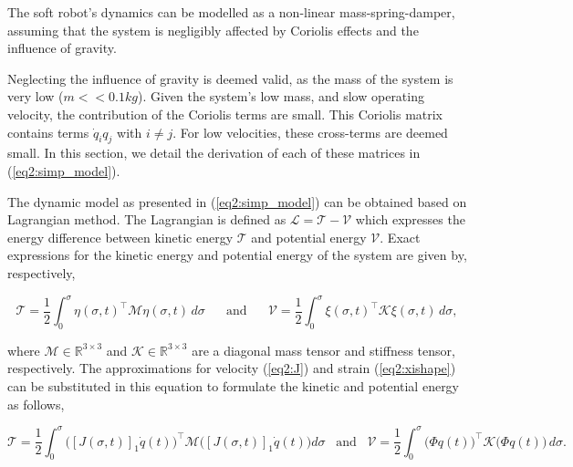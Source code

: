 \begin{theorem}
The soft robot's dynamics can be modelled as a non-linear mass-spring-damper, assuming that the system is negligibly affected by Coriolis effects and the influence of gravity.
\end{theorem}

Neglecting the influence of gravity is deemed valid, as the mass of the system is very low ($m << 0.1 kg$). Given the system's low mass, and slow operating velocity, the contribution of the Coriolis terms are small. This Coriolis matrix contains terms $\dot{q}_i q_j$ with $i \neq j$. For low velocities, these cross-terms are deemed small. In this section, we detail the derivation of each of these matrices in (\ref{eq2:simp_model}).

The dynamic model as presented in (\ref{eq2:simp_model}) can be obtained based on Lagrangian method. The Lagrangian is defined as $\mathcal{L} = \mathcal{T} -\mathcal{V}$ which expresses the energy difference between kinetic energy $\mathcal{T}$ and potential energy $\mathcal{V}$. Exact expressions for the kinetic energy and potential energy of the system are given by, respectively,

\begin{equation}
    \mathcal{T} = \frac{1}{2}\int_0^{\sigma} \eta(\sigma,t)^\top \mathcal{M} \eta(\sigma,t) \hspace{2pt} d \sigma \hspace{20pt} \text{and} \hspace{20pt}  \mathcal{V} = \frac{1}{2}\int_0^{\sigma} \xi(\sigma,t)^\top \mathcal{K} \xi(\sigma,t)  \hspace{2pt} d \sigma,
    \label{eq2:T}
\end{equation}


where $\mathcal{M} \in \mathbb{R}^{3\times3}$ and $\mathcal{K} \in \mathbb{R}^{3\times3}$ are a diagonal mass tensor and stiffness tensor, respectively. The approximations for velocity (\ref{eq2:J}) and strain (\ref{eq2:xishape}) can be substituted in this equation to formulate the kinetic and potential energy as follows,

\begin{equation}
    \mathcal{T} = \frac{1}{2}\int_0^{\sigma} \Big([J(\sigma,t)]_1\dot{q}(t)\Big)^\top \mathcal{M} \Big([J(\sigma,t)]_1\dot{q}(t)\Big) d \sigma  \hspace{10pt} \text{and} \hspace{10pt}  \mathcal{V} = \frac{1}{2}\int_0^{\sigma} \big(\Phi q(t)\big)^\top \mathcal{K} \big(\Phi q(t)\big) \hspace{2pt} d \sigma.
\end{equation}

